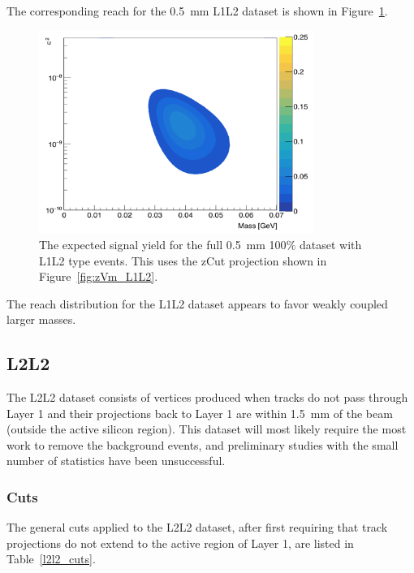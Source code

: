 \documentclass[twoside]{article}
\begin{document}
The corresponding reach for the 0.5~mm L1L2 dataset is shown in Figure~\ref{fig:reachl1l2}.

\begin{figure}[H]
  \centering
     \includegraphics[width=0.8\textwidth]{plots/reachL1L2.png}
  \caption{The expected signal yield for the full 0.5~mm 100$\%$ dataset with L1L2 type events. This uses the zCut projection shown in Figure~\ref{fig:zVm_L1L2}.}
  \label{fig:reachl1l2}
\end{figure} 

The reach distribution for the L1L2 dataset appears to favor weakly coupled larger masses. 

\subsection{L2L2}

The L2L2 dataset consists of vertices produced when tracks do not pass through Layer 1 and their projections back to Layer 1 are within 1.5~mm of the beam (outside the active silicon region). This dataset will most likely require the most work to remove the background events, and preliminary studies with the small number of statistics have been unsuccessful. 

\subsubsection{Cuts}

The general cuts applied to the L2L2 dataset, after first requiring that track projections do not extend to the active region of Layer 1, are listed in Table~\ref{l2l2_cuts}.
\end{document}

